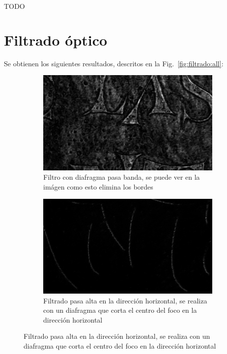 \documentclass{./packages/optica-article}
\begin{document}
TODO



\section{Filtrado óptico}
Se obtienen los siguientes resultados, descritos en la Fig.~\ref{fig:filtrado:all}:

\begin{figure}[hptb]
	\begin{center}
		\begin{subfigure}[t]{0.45\textwidth}\centering
			\includegraphics[width=\textwidth]{parte4-filtrado/4f-pic-2ocm-diafragm-10cm-camera-letters-diafragma_y_punto-pasabanda.png}
			\caption{Filtro con diafragma pasa banda, se puede ver en la imágen como esto elimina los bordes}
			\label{fig:filtrado1}
		\end{subfigure}
		\quad
		\begin{subfigure}[t]{0.45\textwidth}\centering
			\includegraphics[width=\textwidth]{parte4-filtrado/4f-pic-2ocm-diafragm-10cm-camera-letters-high-frequency-almost-x.png}
			\caption{Filtrado pasa alta en la dirección horizontal, se realiza con un diafragma que corta el centro del foco en la dirección horizontal}

\end{subfigure}
\end{center}
\end{figure}
\end{document}
